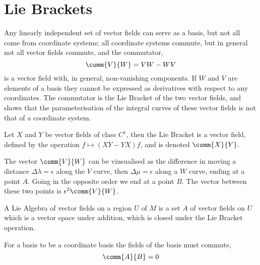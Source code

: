 \section{Lie Brackets}
\label{sec:lie-brackets}

Any linearly independent set of vector fields can serve as a basis,
but not all come from coordinate systems; all coordinate systems commute, but in general not all vector fields commute, and the commutator,
\[ \comm{V}{W} = V W - W V \] is a vector field with, in general,
non-vanishing components. If $W$ and $V$ are elements of a basis they
cannot be expressed as derivatives with respect to any
coordinates. The commutator is the Lie Bracket of the two vector
fields, and shows that the parameterisation of the integral curves of
these vector fields is not that of a coordinate system.

\begin{definition}
  Let $X$ and $Y$ be vector fields of class $C^1$, then the Lie
  Bracket is a vector field, defined by the operation $f \mapsto (XY -
  YX) f$, and is denoted $\comm{X}{Y}$.
\end{definition}

The vector $\comm{V}{W}$ can be viusualised as the difference in
moving a distance $\Delta \lambda = \epsilon$ along the $V$ curve,
then $\Delta \mu = \epsilon$ along a $W$ curve, ending at a point
$A$. Going in the opposite order we end at a point $B$. The vector
between these two points is $\epsilon^2 \comm{V}{W}$.

A Lie Algebra of vector fields on a region $U$ of $M$ is a set $A$ of
vector fields on $U$ which is a vector space under addition, which is
closed under the Lie Bracket operation.

For a basis to be a coordinate basis the fields of the basis must commute,
\[\comm{A}{B} = 0 \]

